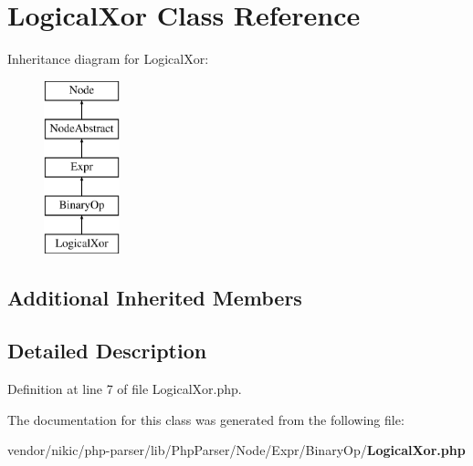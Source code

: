 \section{Logical\+Xor Class Reference}
\label{class_php_parser_1_1_node_1_1_expr_1_1_binary_op_1_1_logical_xor}
Inheritance diagram for Logical\+Xor\+:\begin{figure}[H]
\begin{center}
\leavevmode
\includegraphics[height=5.000000cm]{class_php_parser_1_1_node_1_1_expr_1_1_binary_op_1_1_logical_xor}
\end{center}
\end{figure}
\subsection*{Additional Inherited Members}


\subsection{Detailed Description}


Definition at line 7 of file Logical\+Xor.\+php.



The documentation for this class was generated from the following file\+:\begin{DoxyCompactItemize}
\item 
vendor/nikic/php-\/parser/lib/\+Php\+Parser/\+Node/\+Expr/\+Binary\+Op/{\bf Logical\+Xor.\+php}\end{DoxyCompactItemize}
